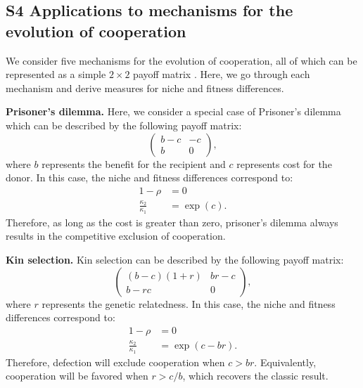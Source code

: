 \documentclass[12pt]{article}
\begin{document}
\subsection*{S4 Applications to mechanisms for the evolution of cooperation}

We consider five mechanisms for the evolution of cooperation, all of which can be represented as a simple $2\times 2$ payoff matrix \citep{nowak2006five}.
Here, we go through each mechanism and derive measures for niche and fitness differences.

\textbf{Prisoner's dilemma.}
Here, we consider a special case of Prisoner's dilemma which can be described by the following payoff matrix:
\begin{equation}
\begin{pmatrix}
b-c & -c \\
b & 0
\end{pmatrix},
\end{equation}
where $b$ represents the benefit for the recipient and $c$ represents cost for the donor.
In this case, the niche and fitness differences correspond to:
\begin{align}
1-\rho &= 0\\
\frac{\kappa_2}{\kappa_1} &= \exp\left(c\right).
\end{align}
Therefore, as long as the cost is greater than zero, prisoner's dilemma always results in the competitive exclusion of cooperation.

\textbf{Kin selection.}
Kin selection can be described by the following payoff matrix:
\begin{equation}
\begin{pmatrix}
(b-c)(1+r) & br-c \\
b-rc & 0
\end{pmatrix},
\end{equation}
where $r$ represents the genetic relatedness. 
In this case, the niche and fitness differences correspond to:
\begin{align}
1-\rho &= 0\\
\frac{\kappa_2}{\kappa_1} &= \exp\left(c-br\right).
\end{align}
Therefore, defection will exclude cooperation when $c > br$. Equivalently, cooperation will be favored when $r > c/b$, which recovers the classic result.
\end{document}

